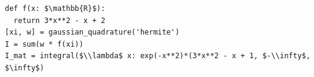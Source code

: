 \documentclass[border=10pt]{standalone}
\begin{document}
\begin{lstlisting}
def f(x: $\mathbb{R}$):
  return 3*x**2 - x + 2
[xi, w] = gaussian_quadrature('hermite')
I = sum(w * f(xi))
I_mat = integral($\\lambda$ x: exp(-x**2)*(3*x**2 - x + 1, $-\\infty$, $\infty$)
\end{lstlisting}
\end{document}
